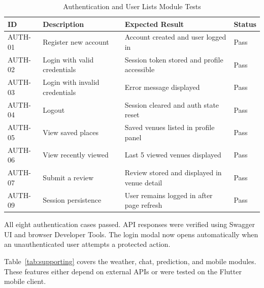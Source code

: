 \documentclass[conference]{IEEEtran}
\begin{document}
\begin{table}[htbp]
\caption{Authentication and User Lists Module Tests}
\label{tab:authlists}
\begin{center}
\scriptsize
\setlength{\tabcolsep}{1pt}
\begin{tabular}{@{}|p{}|p{}|p{}|p{}|@{}}
\hline
\textbf{ID} & \textbf{Description} & \textbf{Expected Result} & \textbf{Status} \\
\hline
AUTH-01 & Register new account & Account created and user logged in & Pass \\
\hline
AUTH-02 & Login with valid credentials & Session token stored and profile accessible & Pass \\
\hline
AUTH-03 & Login with invalid credentials & Error message displayed & Pass \\
\hline
AUTH-04 & Logout & Session cleared and auth state reset & Pass \\
\hline
AUTH-05 & View saved places & Saved venues listed in profile panel & Pass \\
\hline
AUTH-06 & View recently viewed & Last 5 viewed venues displayed & Pass \\
\hline
AUTH-07 & Submit a review & Review stored and displayed in venue detail & Pass \\
\hline
AUTH-09 & Session persistence & User remains logged in after page refresh & Pass \\
\hline
\end{tabular}
\end{center}
\end{table}

All eight authentication cases passed. API responses were verified using Swagger UI and browser Developer Tools. The login modal now opens automatically when an unauthenticated user attempts a protected action.

Table~\ref{tab:supporting} covers the weather, chat, prediction, and mobile modules. These features either depend on external APIs or were tested on the Flutter mobile client.
\end{document}
